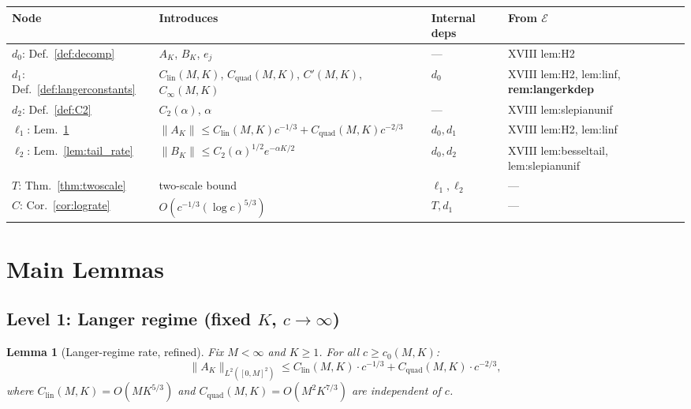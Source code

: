 \documentclass[12pt,a4paper]{amsart}
\newtheorem{lemma}[theorem]{Lemma}
\theoremstyle{definition}
\newcommand{\normh}[2]{\|#1\|_{#2}}
\newcommand{\Cprime}{C'(M,K)}
\newcommand{\Clin}{C_{\mathrm{lin}}(M,K)}
\newcommand{\Cquad}{C_{\mathrm{quad}}(M,K)}
\newcommand{\Ctwo}{C_2(\alpha)}
\newcommand{\AK}{A_K}
\newcommand{\BK}{B_K}
\newcommand{\Cinfty}{C_\infty(M,K)}
\begin{document}
\begin{center}
\renewcommand{\arraystretch}{1.2}
\begin{tabular}{l l l l}
\toprule
\textbf{Node} & \textbf{Introduces} & \textbf{Internal deps}
  & \textbf{From $\mathcal{E}$} \\
\midrule
$d_0$: Def.~\ref{def:decomp}
  & $\AK$, $\BK$, $e_j$ & ---
  & XVIII lem:H2 \\
$d_1$: Def.~\ref{def:langerconstants}
  & $\Clin$, $\Cquad$, $\Cprime$, $\Cinfty$ & $d_0$
  & XVIII lem:H2, lem:linf, \textbf{rem:langerkdep} \\
$d_2$: Def.~\ref{def:C2}
  & $\Ctwo$, $\alpha$ & ---
  & XVIII lem:slepianunif \\
\hline
$\ell_1$: Lem.~\ref{lem:langer_rate}
  & $\normh{\AK}{}\leq\Clin c^{-1/3}+\Cquad c^{-2/3}$ & $d_0,d_1$
  & XVIII lem:H2, lem:linf \\
$\ell_2$: Lem.~\ref{lem:tail_rate}
  & $\normh{\BK}{}\leq\Ctwo^{1/2}e^{-\alpha K/2}$ & $d_0,d_2$
  & XVIII lem:besseltail, lem:slepianunif \\
\hline
$T$: Thm.~\ref{thm:twoscale}
  & two-scale bound & $\ell_1,\ell_2$ & --- \\
$C$: Cor.~\ref{cor:lograte}
  & $O(c^{-1/3}(\log c)^{5/3})$ & $T,d_1$ & --- \\
\bottomrule
\end{tabular}
\end{center}

\section{Main Lemmas}
\label{sec:lemmas}

\subsection{Level 1: Langer regime (fixed $K$, $c\to\infty$)}
\label{ssec:langer}

\begin{lemma}[Langer-regime rate, refined]
\label{lem:langer_rate}
Fix $M < \infty$ and $K \geq 1$.
For all $c \geq c_0(M,K)$:
\begin{equation}\label{eq:term1}
  \normh{\AK}{L^2([0,M]^2)}
  \leq \Clin\cdot c^{-1/3} + \Cquad\cdot c^{-2/3},
\end{equation}
where $\Clin = O(MK^{5/3})$ and $\Cquad = O(M^2K^{7/3})$
are independent of $c$.
\end{lemma}
\end{document}
